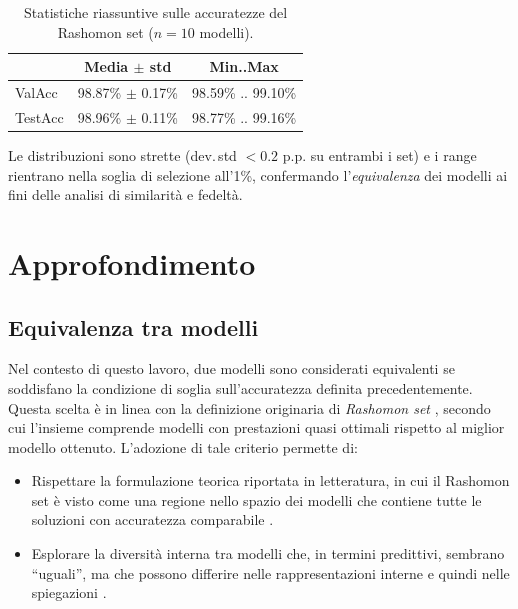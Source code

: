 \documentclass[12pt,a4paper,oneside]{report}
\numberwithin{figure}{chapter}
\numberwithin{table}{chapter}
\begin{document}
\begin{table}[H]
      \centering
      \begin{minipage}{0.70\linewidth}
            \centering
            \renewcommand{\arraystretch}{1.1}
            \begin{tabular}{lcc}
                  \hline
                          & \textbf{Media $\pm$ std} & \textbf{Min..Max}  \\
                  \hline
                  ValAcc  & 98.87\% $\pm$ 0.17\%     & 98.59\% .. 99.10\% \\
                  TestAcc & 98.96\% $\pm$ 0.11\%     & 98.77\% .. 99.16\% \\
                  \hline
            \end{tabular}
            \caption{Statistiche riassuntive sulle accuratezze del Rashomon set ($n=10$ modelli).}
            \label{tab:rashomon_acc_summary}
      \end{minipage}
\end{table}

\noindent
Le distribuzioni sono strette (dev.\,std $< 0.2$ p.p. su entrambi i set) e
i range rientrano nella soglia di selezione all’1\%, confermando l’\emph{equivalenza}
dei modelli ai fini delle analisi di similarità e fedeltà.

\section{Approfondimento}
\subsection{Equivalenza tra modelli}
Nel contesto di questo lavoro, due modelli sono considerati equivalenti se
soddisfano la condizione di soglia sull’accuratezza definita precedentemente.
Questa scelta è in linea con la definizione originaria di \emph{Rashomon set}
\citep{fisher2019all}, secondo cui l’insieme comprende modelli con prestazioni
quasi ottimali rispetto al miglior modello ottenuto. L’adozione di tale
criterio permette di:
\begin{itemize}
      \item Rispettare la formulazione teorica riportata in letteratura, in cui il Rashomon
            set è visto come una regione nello spazio dei modelli che contiene tutte le
            soluzioni con accuratezza comparabile \citep{mueller2023rashomon}.
      \item Esplorare la diversità interna tra modelli che, in termini predittivi, sembrano
            “uguali”, ma che possono differire nelle rappresentazioni interne e quindi
            nelle spiegazioni \citep{leventi2023consistency}.
\end{itemize}
\end{document}
